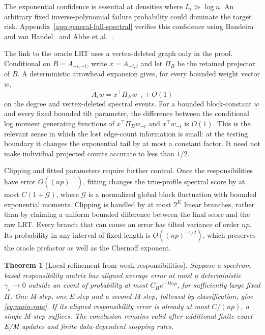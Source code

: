 \documentclass[11pt]{article}
\newtheorem{theorem}{Theorem}[section]
\theoremstyle{definition}
\theoremstyle{remark}
\numberwithin{equation}{section}
\begin{document}
The exponential confidence is essential at densities where $I_n\gg\log n$. An arbitrary fixed inverse-polynomial failure probability could dominate the target risk. Appendix~\ref{app:general-full-spectral} verifies this confidence using Bandeira and van Handel~\citep[Corollary 3.12 and Remark 3.13]{bandeiravhandel2016} and Abbe et al.~\citep[Theorem 2.1 and Lemma 7]{abbe2020}.

The link to the oracle LRT uses a vertex-deleted graph only in the proof. Conditional on $B=A_{-i,-i}$, write $x=A_{-i,i}$ and let $\Pi_B$ be the retained projector of $B$. A deterministic arrowhead expansion gives, for every bounded weight vector $w$,
\begin{equation}
 \widetilde A_iw=x^\top\Pi_Bw_{-i}+O(1)
 \label{eq:main-arrowhead}
\end{equation}
on the degree and vertex-deleted spectral events. For a bounded block-constant $w$ and every fixed bounded tilt parameter, the difference between the conditional log moment generating functions of $x^\top\Pi_Bw_{-i}$ and $x^\top w_{-i}$ is $O(1)$. This is the relevant sense in which the lost edge-count information is small: at the testing boundary it changes the exponential tail by at most a constant factor. It need not make individual projected counts accurate to less than $1/2$.

Clipping and fitted parameters require further control. Once the responsibilities have error $O((np)^{-1})$, fitting changes the true-profile spectral score by at most $C(1+\mathcal G)$, where $\mathcal G$ is a normalized global block fluctuation with bounded exponential moments. Clipping is handled by at most $2^K$ linear branches, rather than by claiming a uniform bounded difference between the final score and the raw LRT. Every branch that can cause an error has tilted variance of order $np$. Its probability in any interval of fixed length is $O((np)^{-1/2})$, which preserves the oracle prefactor as well as the Chernoff exponent.

\begin{theorem}[Local refinement from weak responsibilities]
\label{thm:local-spectral-em}
Suppose a spectrum-based responsibility matrix has aligned average error at most a deterministic $\gamma_n\to0$ outside an event of probability at most $C_H e^{-Hnp}$, for sufficiently large fixed $H$. One M-step, one E-step and a second M-step, followed by classification, give \eqref{eq:main-rate}. If its aligned responsibility error is already at most $C/(np)$, a single M-step suffices. The conclusion remains valid after additional finite exact E/M updates and finite data-dependent stopping rules.
\end{theorem}
\end{document}
